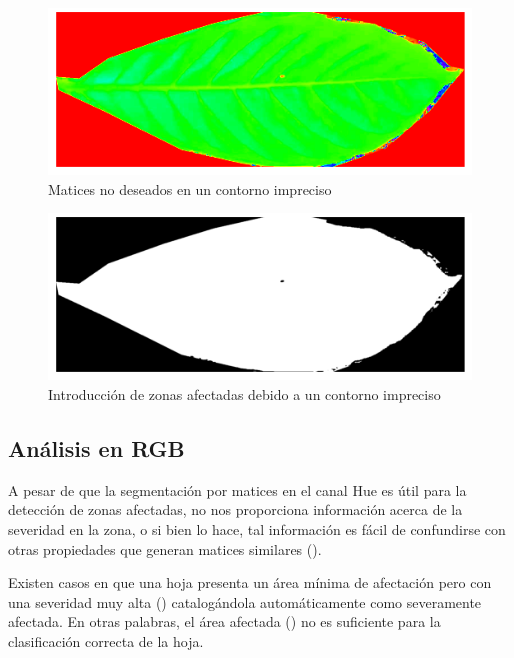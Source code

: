 \begin{figure}[H]
\centering
\includegraphics[scale=1]{images/consideration_contour_hue.png}
\caption{Matices no deseados en un contorno impreciso}
\label{img:issue_countour_hue}
\end{figure}

\begin{figure}[H]
\centering
\includegraphics[scale=1]{images/consideration_contour_binary.png}
\caption{Introducción de zonas afectadas debido a un contorno impreciso}
\label{img:issue_countour_binary}
\end{figure}

\subsection{Análisis en RGB}
A pesar de que la segmentación por matices en el canal Hue es útil para la detección de zonas afectadas, no nos proporciona información acerca de la severidad en la zona, o si bien lo hace, tal información es fácil de confundirse con otras propiedades que generan matices similares ().

Existen casos en que una hoja presenta un área mínima de afectación pero con una severidad muy alta () catalogándola automáticamente como severamente afectada. En otras palabras, el área afectada () no es suficiente para la clasificación correcta de la hoja.

